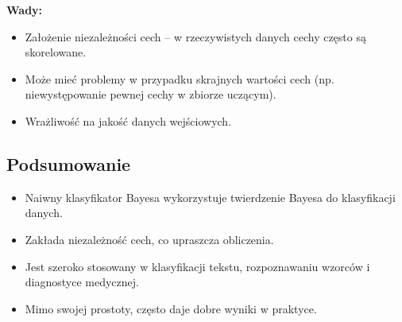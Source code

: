 \textbf{Wady:}
\begin{itemize}
    \item Założenie niezależności cech – w rzeczywistych danych cechy często są skorelowane.
    \item Może mieć problemy w przypadku skrajnych wartości cech (np. niewystępowanie pewnej cechy w zbiorze uczącym).
    \item Wrażliwość na jakość danych wejściowych.
\end{itemize}

\subsection{Podsumowanie}
\begin{itemize}
    \item Naiwny klasyfikator Bayesa wykorzystuje twierdzenie Bayesa do klasyfikacji danych.
    \item Zakłada niezależność cech, co upraszcza obliczenia.
    \item Jest szeroko stosowany w klasyfikacji tekstu, rozpoznawaniu wzorców i diagnostyce medycznej.
    \item Mimo swojej prostoty, często daje dobre wyniki w praktyce.
\end{itemize}
